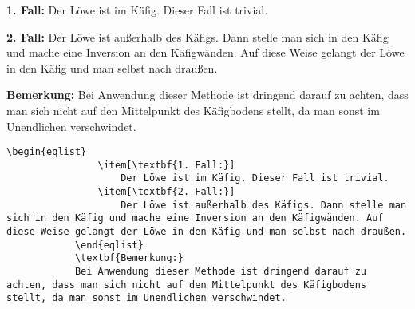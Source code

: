 \documentclass["WS\space 16-17\space -\space LaTeX-Kurs\space -\space Praesentation\space -\space 2.tex"]{subfiles}
\begin{document}
\begin{frame}[fragile]
	\vspace{-0.2cm}
	\Losung
		\begin{outputbox}
			\vspace{-0.3cm}
			\begin{eqlist}
				\item[\textbf{1. Fall:}]
					Der Löwe ist im Käfig. Dieser Fall ist trivial.
				\item[\textbf{2. Fall:}]
					Der Löwe ist außerhalb des Käfigs. Dann stelle man sich in den Käfig und mache eine Inversion an den Käfigwänden. Auf diese Weise gelangt der Löwe in den Käfig und man selbst nach draußen.
			\end{eqlist}
			\vspace{-0.3cm}
			\textbf{Bemerkung:}
			Bei Anwendung dieser Methode ist dringend darauf zu achten, dass man sich nicht auf den Mittelpunkt des Käfigbodens stellt, da man sonst im Unendlichen verschwindet.
		\end{outputbox}
	\vspace{-0.2cm}
	\Code
		\begin{lstlisting}[gobble=12]
			\begin{eqlist}
				\item[\textbf{1. Fall:}]
					Der Löwe ist im Käfig. Dieser Fall ist trivial.
				\item[\textbf{2. Fall:}]
					Der Löwe ist außerhalb des Käfigs. Dann stelle man sich in den Käfig und mache eine Inversion an den Käfigwänden. Auf diese Weise gelangt der Löwe in den Käfig und man selbst nach draußen.
			\end{eqlist}
			\textbf{Bemerkung:}
			Bei Anwendung dieser Methode ist dringend darauf zu achten, dass man sich nicht auf den Mittelpunkt des Käfigbodens stellt, da man sonst im Unendlichen verschwindet.
		\end{lstlisting}
\end{frame}
\end{document}
